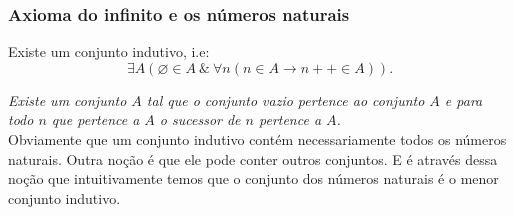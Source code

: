       \subsubsection{Axioma do infinito e os números naturais}
         \begin{stat}
            Existe um conjunto indutivo, i.e:
            $$\exists A\left(\varnothing \in A\ \&\ 
            \forall n(n \in A \rightarrow n ++ \in A)\right).$$
         \end{stat}
         \emph{Existe um conjunto $A$ tal que o conjunto vazio pertence ao conjunto $A$ e 
         para todo $n$ que pertence a $A$ o sucessor de $n$ pertence a $A$.}\\
         Obviamente que um conjunto indutivo contém necessariamente todos os números naturais. 
         Outra noção é que ele pode conter outros conjuntos. 
         E é através dessa noção que intuitivamente temos que o conjunto dos números naturais 
         é o menor conjunto indutivo.
